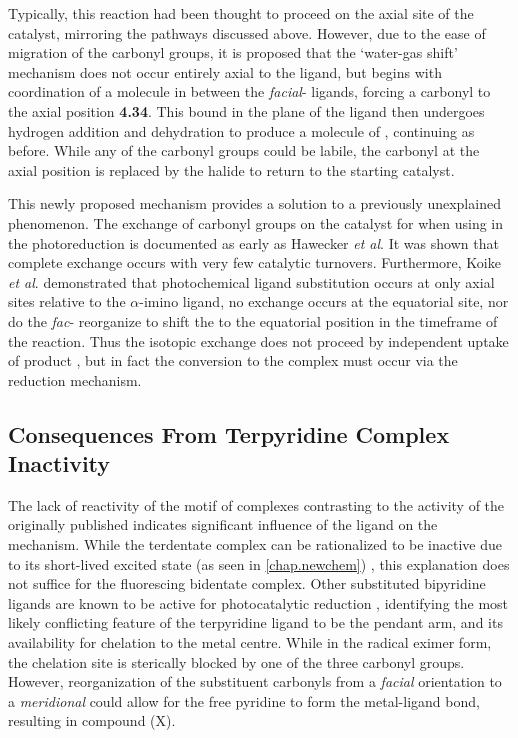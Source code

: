 Typically, this reaction had been thought to proceed on the axial site of the catalyst, mirroring the pathways discussed above. However, due to the ease of migration of the carbonyl groups, it is proposed that the `water-gas shift' mechanism does not occur entirely axial to the ligand, but begins with coordination of a  molecule in between the \textit{facial}- ligands, forcing a carbonyl to the axial position \textbf{4.34}. This  bound in the plane of the ligand then undergoes hydrogen addition and dehydration to produce a molecule of , continuing as before. While any of the carbonyl groups could be labile, the carbonyl at the axial position is replaced by the halide to return to the starting catalyst\autocite{shaver1992}. 

This newly proposed mechanism provides a solution to a previously unexplained phenomenon. The exchange of carbonyl groups on the catalyst for  when using  in the photoreduction is documented as early as Hawecker \textit{et al}\autocite{hawecker1986}. It was shown that complete exchange occurs with very few catalytic turnovers. Furthermore, Koike \textit{et al}. demonstrated that photochemical ligand substitution occurs at only axial sites relative to the $\alpha$-imino ligand\autocite{koike2002}, no exchange occurs at the equatorial site, nor do the \textit{fac}- reorganize to shift the  to the equatorial position in the timeframe of the reaction. Thus the isotopic exchange does not proceed by independent uptake of product , but in fact the conversion to the  complex must occur via the reduction mechanism. 

\FloatBarrier

\subsection{Consequences From \texorpdfstring{}{Bidentate} Terpyridine Complex Inactivity}

The lack of reactivity of the  motif of complexes contrasting to the activity of the originally published  indicates significant influence of the ligand on the mechanism. While the terdentate complex can be rationalized to be inactive due to its short-lived excited state (as seen in \autoref{chap.newchem}) \autocite{shavaleev2004}, this explanation does not suffice for the fluorescing bidentate complex. Other substituted bipyridine ligands are known to be active for photocatalytic reduction \autocite{hawecker1986, kurz2006}, identifying the most likely conflicting feature of the terpyridine ligand to be the pendant arm, and its availability for chelation to the metal centre. While in the radical eximer form, the chelation site is sterically blocked by one of the three carbonyl groups. However, reorganization of the substituent carbonyls from a \textit{facial} orientation to a \textit{meridional} could allow for the free pyridine to form the metal-ligand bond, resulting in compound (X).

